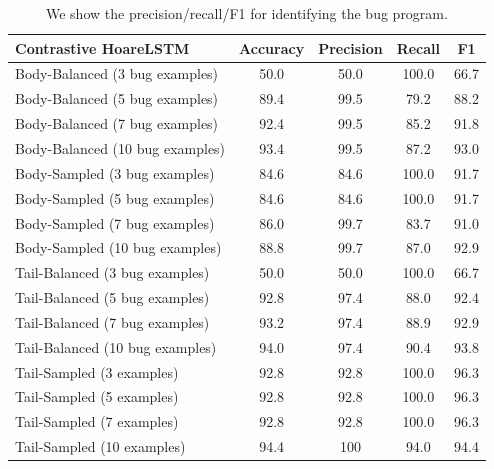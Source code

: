\documentclass{article}
\begin{document}
\begin{table}[]
\centering
\begin{tabular}{@{}lcccc@{}}
\toprule
Contrastive HoareLSTM           & Accuracy & Precision & Recall & F1   \\ \midrule
Body-Balanced (3 bug examples)  & 50.0     & 50.0      & 100.0  & 66.7 \\
Body-Balanced (5 bug examples)  & 89.4     & 99.5      & 79.2   & 88.2 \\
Body-Balanced (7 bug examples)  & 92.4     & 99.5      & 85.2   & 91.8 \\
Body-Balanced (10 bug examples) & 93.4     & 99.5      & 87.2   & 93.0 \\ \midrule
Body-Sampled (3 bug examples)   & 84.6     & 84.6      & 100.0  & 91.7 \\
Body-Sampled (5 bug examples)   & 84.6     & 84.6      & 100.0  & 91.7 \\
Body-Sampled (7 bug examples)   & 86.0     & 99.7      & 83.7   & 91.0 \\
Body-Sampled (10 bug examples)  & 88.8     & 99.7      & 87.0   & 92.9 \\ \midrule
Tail-Balanced (3 bug examples)  & 50.0     & 50.0      & 100.0  & 66.7 \\
Tail-Balanced (5 bug examples)  & 92.8     & 97.4      & 88.0   & 92.4 \\
Tail-Balanced (7 bug examples)  & 93.2     & 97.4      & 88.9   & 92.9 \\
Tail-Balanced (10 bug examples) & 94.0     & 97.4      & 90.4   & 93.8 \\ \midrule
Tail-Sampled (3 examples)       & 92.8     & 92.8      & 100.0  & 96.3 \\
Tail-Sampled (5 examples)       & 92.8     & 92.8      & 100.0  & 96.3 \\
Tail-Sampled (7 examples)       & 92.8     & 92.8      & 100.0  & 96.3 \\
Tail-Sampled (10 examples)      & 94.4     & 100       & 94.0   & 94.4 \\ \bottomrule
\end{tabular}
\vspace{0.3cm}
\caption{We show the precision/recall/F1 for identifying the bug program.}
\label{tab:num}
\end{table}
\end{document}

